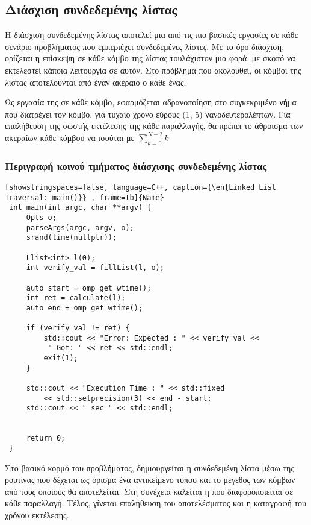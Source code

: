 \clearpage
\subsection{Διάσχιση συνδεδεμένης λίστας}
Η διάσχιση συνδεδεμένης λίστας αποτελεί μια από τις πιο βασικές εργασίες σε κάθε σενάριο προβλήματος που εμπεριέχει συνδεδεμένες λίστες. Με το όρο διάσχιση, ορίζεται η επίσκεψη σε κάθε κόμβο της λίστας τουλάχιστον μια φορά, με σκοπό να εκτελεστεί κάποια λειτουργία σε αυτόν. Στο πρόβλημα που ακολουθεί, οι κόμβοι της λίστας αποτελούνται από έναν ακέραιο ο κάθε ένας. 

Ως εργασία της σε κάθε κόμβο, εφαρμόζεται αδρανοποίηση στο συγκεκριμένο νήμα που διατρέχει τον κόμβο, για τυχαίο χρόνο εύρους (1, 5) νανοδευτερολέπτων. Για επαλήθευση της σωστής εκτέλεσης της κάθε παραλλαγής, θα πρέπει το άθροισμα των ακεραίων κάθε κόμβου  να ισούται με $\sum_{k=0}^{N-2}k$  

\subsubsection{Περιγραφή κοινού τμήματος διάσχισης συνδεδεμένης λίστας}
\begin{spacing}{0.6}
\begin{lstlisting}[showstringspaces=false, language=C++, caption={\en{Linked List Traversal: main()}} , frame=tb]{Name}
 int main(int argc, char **argv) {
     Opts o;
     parseArgs(argc, argv, o);
     srand(time(nullptr));

     Llist<int> l(0);
     int verify_val = fillList(l, o);

     auto start = omp_get_wtime();
     int ret = calculate(l);
     auto end = omp_get_wtime();

     if (verify_val != ret) {
         std::cout << "Error: Expected : " << verify_val <<
          " Got: " << ret << std::endl;
         exit(1);
     }

     std::cout << "Execution Time : " << std::fixed
         << std::setprecision(3) << end - start;
     std::cout << " sec " << std::endl;


     return 0;
 }

\end{lstlisting}
\end{spacing}

Στο βασικό κορμό του προβλήματος, δημιουργείται η συνδεδεμένη λίστα μέσω της ρουτίνας \emph{} που δέχεται ως όρισμα ένα αντικείμενο τύπου  και το μέγεθος των κόμβων από τους οποίους θα αποτελείται. Στη συνέχεια καλείται η  που διαφοροποιείται σε κάθε παραλλαγή. Τέλος, γίνεται επαλήθευση του αποτελέσματος και η καταγραφή του χρόνου εκτέλεσης.


